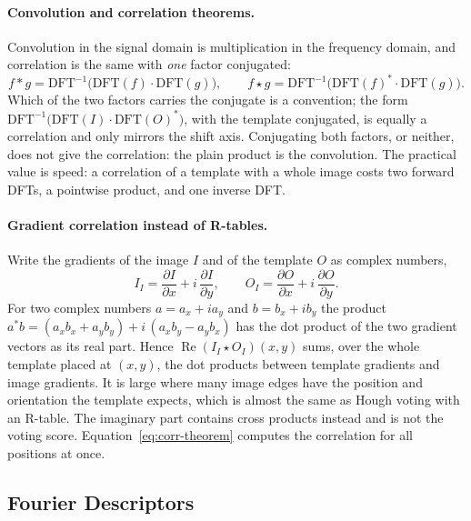 \paragraph{Convolution and correlation theorems.}
Convolution in the signal domain is multiplication in the frequency domain, and
correlation is the same with \emph{one} factor conjugated:
\begin{equation}
  f * g = \mathrm{DFT}^{-1}\bigl(\mathrm{DFT}(f)\cdot\mathrm{DFT}(g)\bigr),
  \qquad
  f \star g = \mathrm{DFT}^{-1}\bigl(\mathrm{DFT}(f)^*\cdot\mathrm{DFT}(g)\bigr).
  \label{eq:corr-theorem}
\end{equation}
\noindent
Which of the two factors carries the conjugate is a convention; the form
$\mathrm{DFT}^{-1}\bigl(\mathrm{DFT}(I)\cdot\mathrm{DFT}(O)^*\bigr)$, with the
template conjugated, is equally a correlation and only mirrors the shift axis.
Conjugating both factors, or neither, does not give the correlation: the plain
product is the convolution. The
practical value is speed: a correlation of a template with a whole image costs
two forward DFTs, a pointwise product, and one inverse DFT.

\paragraph{Gradient correlation instead of R-tables.}
Write the gradients of the image $I$ and of the template $O$ as complex numbers,
\begin{equation}
  I_I = \frac{\partial I}{\partial x} + i\,\frac{\partial I}{\partial y},
  \qquad
  O_I = \frac{\partial O}{\partial x} + i\,\frac{\partial O}{\partial y}.
\end{equation}
\noindent
For two complex numbers $a = a_x + i a_y$ and $b = b_x + i b_y$ the product
$a^* b = (a_x b_x + a_y b_y) + i\,(a_x b_y - a_y b_x)$ has the dot product of the
two gradient vectors as its real part. Hence
$\operatorname{Re}(I_I \star O_I)(x,y)$ sums, over the whole template placed at
$(x,y)$, the dot products between template gradients and image gradients. It is
large where many image edges have the position and orientation the template
expects, which is almost the same as Hough voting with an R-table. The
imaginary part contains cross products instead and is not the voting score.
Equation~\eqref{eq:corr-theorem} computes the correlation for all positions at
once.

\subsection{Fourier Descriptors}

